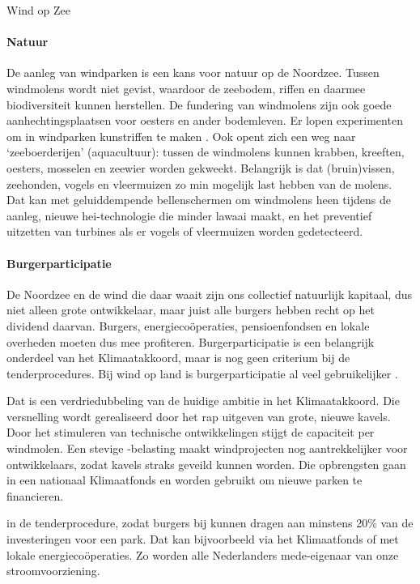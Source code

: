 \begin{voorstel}{Wind op Zee}
\begin{multicols}{2}
\begin{overwegingen}
\paragraph{Natuur}
De aanleg van windparken is een kans voor natuur op de Noordzee. Tussen windmolens wordt niet gevist, waardoor de zeebodem, riffen en daarmee biodiversiteit kunnen herstellen.  De fundering van windmolens zijn ook goede aanhechtingsplaatsen voor oesters en ander bodemleven. Er lopen experimenten om in windparken kunstriffen te maken \parencite{didderen_offshore_2019}. Ook opent zich een weg naar ‘zeeboerderijen’ (aquacultuur): tussen de windmolens kunnen krabben, kreeften, oesters, mosselen en zeewier worden gekweekt.
Belangrijk is dat (bruin)vissen, zeehonden, vogels en vleermuizen zo min mogelijk last hebben van de molens. Dat kan met geluiddempende bellenschermen om windmolens heen tijdens de aanleg, nieuwe hei-technologie die minder lawaai maakt, en het preventief uitzetten van turbines als er vogels of vleermuizen worden gedetecteerd.

\paragraph{Burgerparticipatie}
De Noordzee en de wind die daar waait zijn ons collectief natuurlijk kapitaal, dus niet alleen grote ontwikkelaar, maar juist alle burgers hebben recht op het dividend daarvan. Burgers, energiecoöperaties, pensioenfondsen en lokale overheden moeten dus mee profiteren. Burgerparticipatie is een belangrijk onderdeel van het Klimaatakkoord, maar is nog geen criterium bij de tenderprocedures. Bij wind op land is burgerparticipatie al veel gebruikelijker \parencite{nwea_gedragscode_2016}.

\end{overwegingen}

\begin{aanbevelingen}

Dat is een verdriedubbeling van de huidige ambitie in het Klimaatakkoord. Die versnelling wordt gerealiseerd door het rap uitgeven van grote, nieuwe kavels. Door het stimuleren van technische ontwikkelingen stijgt de capaciteit per windmolen. Een stevige \COO-belasting maakt windprojecten nog aantrekkelijker voor ontwikkelaars, zodat kavels straks geveild kunnen worden. Die opbrengsten gaan in een nationaal Klimaatfonds en worden gebruikt om nieuwe parken te financieren.

 in de tenderprocedure, zodat burgers bij kunnen dragen aan minstens 20\% van de investeringen voor een park.
Dat kan bijvoorbeeld via het Klimaatfonds of met lokale energiecoöperaties. Zo worden alle Nederlanders mede-eigenaar van onze stroomvoorziening.


\end{aanbevelingen}
\end{multicols}
\end{voorstel}
